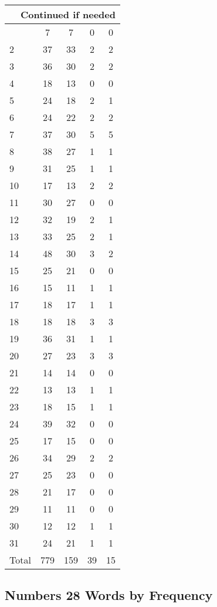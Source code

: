 \begin{center}
\begin{longtable}{l|c|c|c|c}
\hline \multicolumn{5}{|r|}{{Continued if needed}} \\ \hline
\endfoot 
1 & 7 & 7 & 0 & 0\\ \hline
2 & 37 & 33 & 2 & 2\\ \hline
3 & 36 & 30 & 2 & 2\\ \hline
4 & 18 & 13 & 0 & 0\\ \hline
5 & 24 & 18 & 2 & 1\\ \hline
6 & 24 & 22 & 2 & 2\\ \hline
7 & 37 & 30 & 5 & 5\\ \hline
8 & 38 & 27 & 1 & 1\\ \hline
9 & 31 & 25 & 1 & 1\\ \hline
10 & 17 & 13 & 2 & 2\\ \hline
11 & 30 & 27 & 0 & 0\\ \hline
12 & 32 & 19 & 2 & 1\\ \hline
13 & 33 & 25 & 2 & 1\\ \hline
14 & 48 & 30 & 3 & 2\\ \hline
15 & 25 & 21 & 0 & 0\\ \hline
16 & 15 & 11 & 1 & 1\\ \hline
17 & 18 & 17 & 1 & 1\\ \hline
18 & 18 & 18 & 3 & 3\\ \hline
19 & 36 & 31 & 1 & 1\\ \hline
20 & 27 & 23 & 3 & 3\\ \hline
21 & 14 & 14 & 0 & 0\\ \hline
22 & 13 & 13 & 1 & 1\\ \hline
23 & 18 & 15 & 1 & 1\\ \hline
24 & 39 & 32 & 0 & 0\\ \hline
25 & 17 & 15 & 0 & 0\\ \hline
26 & 34 & 29 & 2 & 2\\ \hline
27 & 25 & 23 & 0 & 0\\ \hline
28 & 21 & 17 & 0 & 0\\ \hline
29 & 11 & 11 & 0 & 0\\ \hline
30 & 12 & 12 & 1 & 1\\ \hline
31 & 24 & 21 & 1 & 1\\ \hline
Total & 779 & 159 & 39 & 15
\end{longtable}
\end{center}





\subsection{Numbers 28 Words by Frequency}



